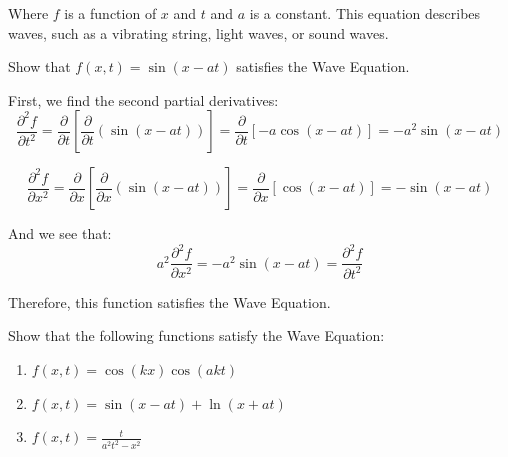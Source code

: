 Where $f$ is a function of $x$ and $t$ and $a$ is a constant. This equation 
describes waves, such as a vibrating string, light waves, or sound waves. 

\begin{Worked}
\begin{Problem}
Show that $f(x, t) = \sin{ \left( x - at \right)}$ satisfies 
the Wave Equation. 
\end{Problem}
\begin{Solution}
First, we find the second partial derivatives:
$$\frac{\partial^2 f}{\partial t^2} = \frac{\partial}{\partial t} \left[ \frac{
\partial}{\partial t} \left( \sin{ \left( x - at \right)} \right) \right] = 
\frac{\partial}{\partial t} \left[ -a\cos{\left(x - at \right)} \right] = -a^2
\sin{\left(x - at \right)}$$

$$\frac{\partial^2 f}{\partial x^2} = \frac{\partial}{\partial x} \left[ \frac{
\partial}{\partial x} \left( \sin{ \left( x - at \right)} \right) \right] = 
\frac{\partial}{\partial x} \left[ \cos{\left( x - at \right)}\right] = -\sin{
\left( x - at \right)}$$

And we see that:
$$a^2 \frac{\partial^2 f}{\partial x^2} = -a^2 \sin{\left(x - at \right)} = 
\frac{\partial^2 f}{\partial t^2}$$

Therefore, this function satisfies the Wave Equation. 
\end{Solution}
\end{Worked}

\begin{Exercise}[title = {The Wave Equation}, label = wave]
Show that the following functions satisfy the Wave Equation:
\begin{enumerate}
    \item $f(x, t) = \cos{\left(kx \right)}\cos{\left(akt \right)}$
    \item $f(x, t) = \sin{\left( x - at \right)} + \ln{ \left( x + at 
    \right)}$
    \item $f(x, t) = \frac{t}{a^2t^2 - x^2}$
\end{enumerate}
\end{Exercise}


